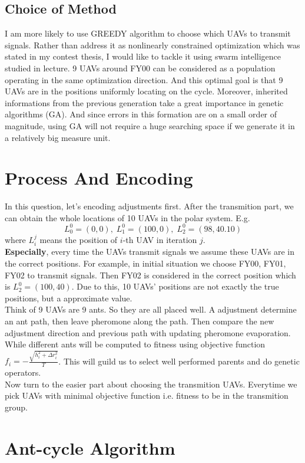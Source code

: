 \documentclass[11pt,en]{elegantpaper}
\begin{document}
\subsection{Choice of Method}
I am more likely to use GREEDY algorithm to choose which UAVs to transmit signals.
Rather than address it as nonlinearly constrained optimization which was stated in my contest thesis,
I would like to tackle it using swarm intelligence studied in lecture.
9 UAVs around FY00 can be considered as a population operating in the same optimization direction.
And this optimal goal is that 9 UAVs are in the positions uniformly locating on the cycle.
Moreover, inherited informations from the previous generation take a great importance in genetic algorithms (GA).
And since errors in this formation are on a small order of magnitude, using GA will not require a huge searching space 
if we generate it in a relatively big measure unit.

\section{Process And Encoding}
In this question, let's encoding adjustments first.
After the transmition part, we can obtain the whole locations of 10 UAVs in the polar system.
E.g. \[L_0^0=(0,0),\; L_1^0=(100,0),\; L_2^0=(98,40.10)\] where $L_i^j$ means the position of $i$-th UAV in iteration $j$.
\\ \textbf{Especially}, every time the UAVs transmit signals we assume these UAVs are in the correct positions.
For example, in initial situation we choose FY00, FY01, FY02 to transmit signals.
Then FY02 is considered in the correct position which is $L_2^0 = (100,40)$.
Due to this, 10 UAVs' positions are not exactly the true positions, but a approximate value.
\\Think of 9 UAVs are 9 ants. So they are all placed well.
A adjustment determine an ant path, then leave pheromone along the path.
Then compare the new adjustment direction and previous path with updating pheromone evaporation.
While different ants will be computed to fitness using objective function $f_i =-\frac{\sqrt{ h_i^2 + \Delta r_i^2}}{T} $.
This will guild us to select well performed parents and do genetic operators.
\\Now turn to the easier part about choosing the transmition UAVs.
Everytime we pick UAVs with minimal objective function i.e. fitness to be in the transmition group.

\section{Ant-cycle Algorithm}
\end{document}
